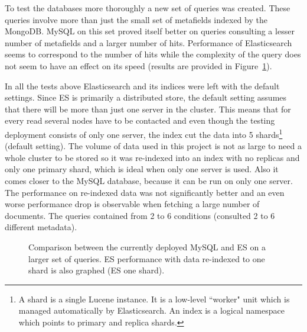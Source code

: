 To test the databases more thoroughly a new set of queries was created. These queries involve more than just the 
small set of metafields indexed by the MongoDB. MySQL on this set proved itself better on queries consulting
a lesser number of metafields and a larger number of hits. Performance of Elasticsearch seems to correspond
to the number of hits while the complexity of the query does not seem to have an effect on its speed (results are provided 
in Figure~\ref{fig:wide}).

In all the tests above Elasticsearch and its indices were left with the default settings. Since ES is primarily 
a distributed store, the default setting assumes that there will be more than just one server in the cluster. This
means that for every read several nodes have to be contacted and even though the testing deployment consists of 
only one server, the index cut the data into 5 shards\footnote{A shard is a single Lucene instance. It is a low-level
``worker" unit which is managed automatically by Elasticsearch. An index is a logical namespace which points 
to primary and replica shards.} (default setting). The volume of data used 
in this project is not as large to need a whole cluster to be stored so it was re-indexed into an index 
with no replicas and only one primary shard, which is ideal when only one server is used. Also it comes closer to 
the MySQL database, because it can be run on only one server. The performance on re-indexed data was not 
significantly better and an even worse performance drop is observable when fetching a large number of documents. 
The queries contained from 2 to 6 conditions (consulted 2 to 6 different metadata).

\begin{figure}[h]
	\centering
	
	\caption{Comparison between the currently deployed MySQL and ES on a larger set of queries. 
	ES performance with data re-indexed to one shard is also graphed (ES one shard).}
	\label{fig:wide}
\end{figure}
